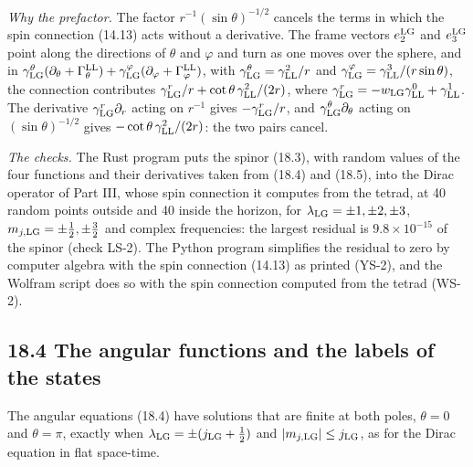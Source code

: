 \documentclass[
  10pt,
]{article}
\begin{document}
\emph{Why the prefactor.} The factor \(r^{-1}(\sin\theta)^{-1/2}\)
cancels the terms in which the spin connection (14.13) acts without a
derivative. The frame vectors \(e^{\rm LG}_2\) and \(e^{\rm LG}_3\)
point along the directions of \(\theta\) and \(\varphi\) and turn as one
moves over the sphere, and in
\(\gamma^\theta_{\rm LG}(\partial_\theta+\Gamma^{\rm LL}_\theta)+\gamma^\varphi_{\rm LG}(\partial_\varphi+\Gamma^{\rm LL}_\varphi)\),
with \(\gamma^\theta_{\rm LG}=\gamma^2_{\rm LL}/r\) and
\(\gamma^\varphi_{\rm LG}=\gamma^3_{\rm LL}/(r\sin\theta)\), the
connection contributes
\(\gamma^r_{\rm LG}/r+\cot\theta\,\gamma^2_{\rm LL}/(2r)\), where
\(\gamma^r_{\rm LG}=-w_{\rm LG}\gamma^0_{\rm LL}+\gamma^1_{\rm LL}\).
The derivative \(\gamma^r_{\rm LG}\partial_r\) acting on \(r^{-1}\)
gives \(-\gamma^r_{\rm LG}/r\), and
\(\gamma^\theta_{\rm LG}\partial_\theta\) acting on
\((\sin\theta)^{-1/2}\) gives \(-\cot\theta\,\gamma^2_{\rm LL}/(2r)\):
the two pairs cancel.

\emph{The checks.} The Rust program puts the spinor (18.3), with random
values of the four functions and their derivatives taken from (18.4) and
(18.5), into the Dirac operator of Part III, whose spin connection it
computes from the tetrad, at 40 random points outside and 40 inside the
horizon, for \(\lambda_{\rm LG}=\pm1,\pm2,\pm3\),
\(m_{j,{\rm LG}}=\pm\tfrac12,\pm\tfrac32\) and complex frequencies: the
largest residual is \(9.8\times10^{-15}\) of the spinor (check LS-2).
The Python program simplifies the residual to zero by computer algebra
with the spin connection (14.13) as printed (YS-2), and the Wolfram
script does so with the spin connection computed from the tetrad (WS-2).

\hypertarget{the-angular-functions-and-the-labels-of-the-states}{%
\subsection{18.4 The angular functions and the labels of the
states}\label{the-angular-functions-and-the-labels-of-the-states}}

The angular equations (18.4) have solutions that are finite at both
poles, \(\theta=0\) and \(\theta=\pi\), exactly when
\(\lambda_{\rm LG}=\pm(j_{\rm LG}+\tfrac12)\) and
\(\lvert m_{j,{\rm LG}}\rvert\le j_{\rm LG}\), as for the Dirac equation
in flat space-time.
\end{document}
